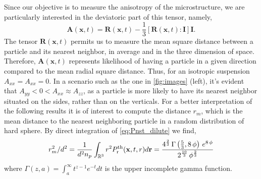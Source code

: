 Since our objective is to measure the anisotropy of the microstructure, we are particularly interested in the deviatoric part of this tensor, namely,
\begin{equation*}
    \textbf{A}(\textbf{x},t) = \textbf{R}(\textbf{x},t) - \frac{1}{3} [\textbf{R}(\textbf{x},t) : \textbf{I}] \textbf{I}.
\end{equation*}
The tensor $\textbf{R}(\textbf{x},t)$ permits us to measure the mean square distance between a particle and its nearest neighbor, in average and in the three dimension of space. 
Therefore, $\textbf{A}(\textbf{x},t)$ represents likelihood of having a particle in a given direction compared to the mean radial square distance. 
Thus, for an isotropic suspension $A_{xx} = A_{xx} = 0$. 
In a scenario such as the one in \ref{fig:images} (left), it's evident that $A_{yy} < 0 < A_{xx} \approx A_{zz}$, as a particle is more likely to have its nearest neighbor situated on the sides, rather than on the verticals.
For a better interpretation of the following results it is of interest to compute the distance $r_m$, which is the mean distance to the nearest neighboring particle in a random distribution of hard sphere. 
By direct integration of \ref{eq:Pnst_dilute} we find, 
\begin{equation*}
    r_m^2 /d^2
    = \frac{1}{d^2n_p} 
    \int_{\mathbb{R}^3} r^2 P_\text{r}^\text{th}(\textbf{x},t,r) d\textbf{r} 
    = {{4^{{{2}\over{3}}}\,\Gamma\left({{5}\over{3}} , 8\,\phi\right)
    \,e^{8\,\phi}}\over{2^{{{10}\over{3}}}\,\phi^{{{2}\over{3}}}}}
\end{equation*}
where $\Gamma(z,a) = \int_a^\infty t^{z-1} e^{-t} dt$ is the upper incomplete gamma function. 

